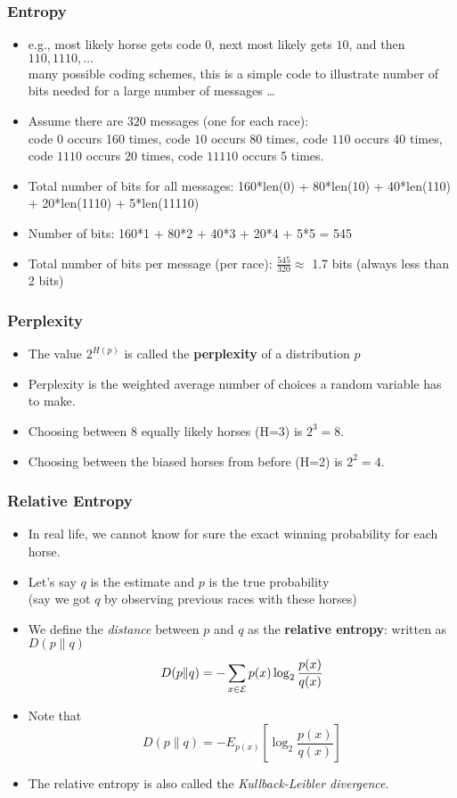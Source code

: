 \begin{frame}
\frametitle{Entropy}
\begin{itemize}[<+->]
\item e.g., most likely horse gets code $0$, next most likely gets $10$, and then $110, 1110, \ldots$ \\ {\small many possible coding schemes, this is a simple code to illustrate number of bits needed for a large number of messages \ldots}
\item Assume there are $320$ messages (one for each race): \\
code $0$ occurs 160 times, code $10$ occurs 80 times, code $110$ occurs 40 times, code $1110$ occurs 20 times, code $11110$ occurs 5 times.
\item Total number of bits for all messages: 160*len(0) + 80*len(10) + 40*len(110) + 20*len(1110) + 5*len(11110) 
\item Number of bits: 160*1 + 80*2 + 40*3 + 20*4 + 5*5 = 545
\item Total number of bits per message (per race): $\frac{545}{320} \approx$ 1.7 bits (always less than 2 bits)
\end{itemize}

\end{frame}

\begin{frame}
\frametitle{Perplexity}
\begin{itemize}[<+->]
\item The value $2^{H(p)}$ is called the {\bf perplexity} of a distribution $p$
\item Perplexity is the weighted average number of choices a random
  variable has to make.
\item Choosing between 8 equally likely horses (H=3) is $2^3 = 8$.
\item Choosing between the biased horses from before (H=2) is $2^2 =
  4$. 
\end{itemize}

\end{frame}

\begin{frame}
\frametitle{Relative Entropy}
\begin{itemize}[<+->]
\item In real life, we cannot know for sure the exact winning
  probability for each horse. 
\item Let's say $q$ is the estimate
  and $p$ is the true probability \\
  {\small (say we got $q$ by observing previous races with these horses)}
\item We define the {\em distance} between $p$ and $q$ as the {\bf relative entropy}: written as $D(p \| q)$
\[ D(p \| q) = - \sum_{x \in {\cal E}} p(x) \log_2 \frac{p(x)}{q(x)} \]
\item Note that
\[ D(p \| q) = - E_{ p(x) } \left[ \log_2 \frac{p(x)}{q(x)} \right] \]
\item The relative entropy is also called the {\em Kullback-Leibler divergence}.
\end{itemize}

\end{frame}

